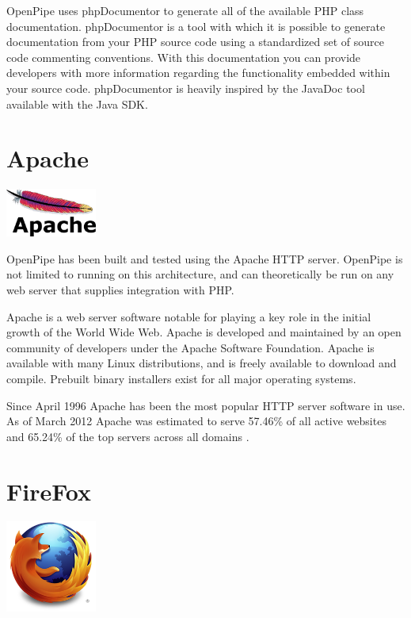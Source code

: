 \documentclass[12pt]{report}
\begin{document}
OpenPipe uses phpDocumentor to generate all of the available PHP class documentation. phpDocumentor is a tool with which it is possible to generate documentation from your PHP source code using a standardized set of source code commenting conventions. With this documentation you can provide developers with more information regarding the functionality embedded within your source code. phpDocumentor is heavily inspired by the JavaDoc tool available with the Java SDK. 


\section{Apache}
\begin{center} 
\includegraphics[width=30mm]{figures/images/apache_logo.png}
\end{center}

OpenPipe has been built and tested using the Apache HTTP server. OpenPipe is not limited to running on this architecture, and can theoretically be run on any web server that supplies integration with PHP.

Apache is a web server software notable for playing a key role in the initial growth of the World Wide Web. Apache is developed and maintained by an open community of developers under the Apache Software Foundation. Apache is available with many Linux distributions, and is freely available to download and compile. Prebuilt binary installers exist for all major operating systems.  

Since April 1996 Apache has been the most popular HTTP server software in use. As of March 2012 Apache was estimated to serve 57.46\% of all active websites and 65.24\% of the top servers across all domains \cite{webserverSurvey}.


\section{FireFox}
\begin{center} 
\includegraphics[width=30mm]{figures/images/firefox_logo.png}
\end{center}
\end{document}
